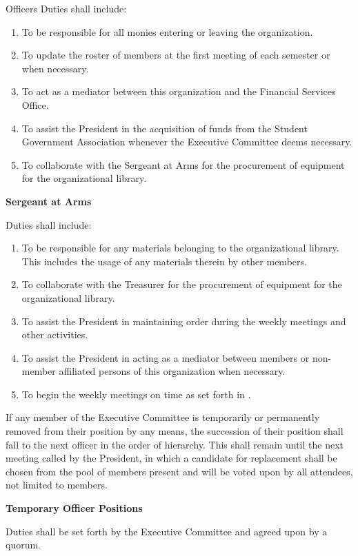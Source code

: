 {\begin{article}{Officers}
		Duties shall include:
		\begin{enumerate}
			\item To be responsible for all monies entering or leaving the organization.
			\item To update the roster of members at the first meeting of each semester or when necessary.
			\item To act as a mediator between this organization and the Financial Services Office.
			\item To assist the President in the acquisition of funds from the Student Government Association whenever the Executive Committee deems necessary.
			\item To collaborate with the Sergeant at Arms for the procurement of equipment for the organizational library.
		\end{enumerate}
		\item \textbf{Sergeant at Arms}
		
		Duties shall include:
		\begin{enumerate}
			\item To be responsible for any materials belonging to the organizational library. This includes the usage of any materials therein by other members.
			\item To collaborate with the Treasurer for the procurement of equipment for the organizational library.
			\item To assist the President in maintaining order during the weekly meetings and other activities.
			\item To assist the President in acting as a mediator between members or non-member affiliated persons of this organization when necessary.
			\item To begin the weekly meetings on time as set forth in .
		\end{enumerate}
		\item If any member of the Executive Committee is temporarily or permanently removed from their position by any means, the succession of their position shall fall to the next officer in the order of hierarchy.  This shall remain until the next meeting called by the President, in which a candidate for replacement shall be chosen from the pool of members present and will be voted upon by all attendees, not limited to members.
		\item \textbf{Temporary Officer Positions}
		
		Duties shall be set forth by the Executive Committee and agreed upon by a quorum.
		

\end{article}}
